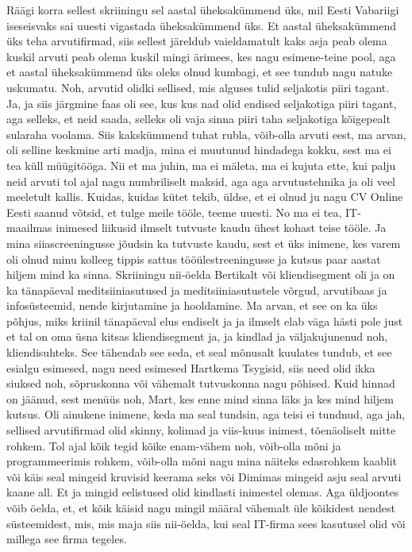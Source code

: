 Räägi korra sellest skriiningu sel aastal üheksakümmend üks, mil Eesti Vabariigi iseseisvaks sai uuesti vigastada üheksakümmend üks. Et aastal üheksakümmend üks teha arvutifirmad, siis sellest järeldub vaieldamatult kaks asja peab olema kuskil arvuti peab olema kuskil mingi ärimees, kes nagu esimene-teine pool, aga et aastal üheksakümmend üks oleks olnud kumbagi, et see tundub nagu natuke uskumatu.
Noh, arvutid olidki sellised, mis alguses tulid seljakotis piiri tagant. Ja, ja siis järgmine faas oli see, kus kus nad olid endised seljakotiga piiri tagant, aga selleks, et neid saada, selleks oli vaja sinna piiri taha seljakotiga kõigepealt sularaha voolama. Siis kakskümmend tuhat rubla, võib-olla arvuti eest, ma arvan, oli selline keskmine arti madja, mina ei muutunud hindadega kokku, sest ma ei tea küll müügitööga. Nii et ma juhin, ma ei mäleta, ma ei kujuta ette, kui palju neid arvuti tol ajal nagu numbriliselt maksid, aga aga arvutustehnika ja oli veel meeletult kallis.
Kuidas, kuidas kütet tekib, üldse, et ei olnud ju nagu CV Online Eesti saanud võtsid, et tulge meile tööle, teeme uuesti.
No ma ei tea, IT-maailmas inimesed liikusid ilmselt tutvuste kaudu ühest kohast teise tööle. Ja mina siiascreeningusse jõudsin ka tutvuste kaudu, sest et üks inimene, kes varem oli olnud minu kolleeg tippis sattus tööülestreeningusse ja kutsus paar aastat hiljem mind ka sinna. Skriiningu nii-öelda Bertikalt või kliendisegment oli ja on ka tänapäeval meditsiiniasutused ja meditsiiniasutustele võrgud, arvutibaas ja infosüsteemid, nende kirjutamine ja hooldamine. Ma arvan, et see on ka üks põhjus, miks kriinil tänapäeval elus endiselt ja ja ilmselt elab väga hästi pole just et tal on oma üsna kitsas kliendisegment ja, ja kindlad ja väljakujunenud noh, kliendisuhteks.
See tähendab see seda, et seal mõnusalt kuulates tundub, et see esialgu esimesed, nagu need esimesed Hartkema Tsygisid, siis need olid ikka siuksed noh, sõpruskonna või vähemalt tutvuskonna nagu põhised.
Kuid hinnad on jäänud, sest menüüs noh, Mart, kes enne mind sinna läks ja kes mind hiljem kutsus.
Oli ainukene inimene, keda ma seal tundsin, aga teisi ei tundnud, aga jah, sellised arvutifirmad olid skinny, kolimad ja viis-kuus inimest, tõenäoliselt mitte rohkem. Tol ajal kõik tegid kõike enam-vähem noh, võib-olla mõni ja programmeerimis rohkem, võib-olla mõni nagu mina näiteks edasrohkem kaablit või käis seal mingeid kruvisid keerama seks või Dimimas mingeid asju seal arvuti kaane all. Et ja mingid eelistused olid kindlasti inimestel olemas. Aga üldjoontes võib öelda, et, et kõik käisid nagu mingil määral vähemalt üle kõikidest nendest süsteemidest, mis, mis maja siis nii-öelda, kui seal IT-firma sees kasutusel olid või millega see firma tegeles.

